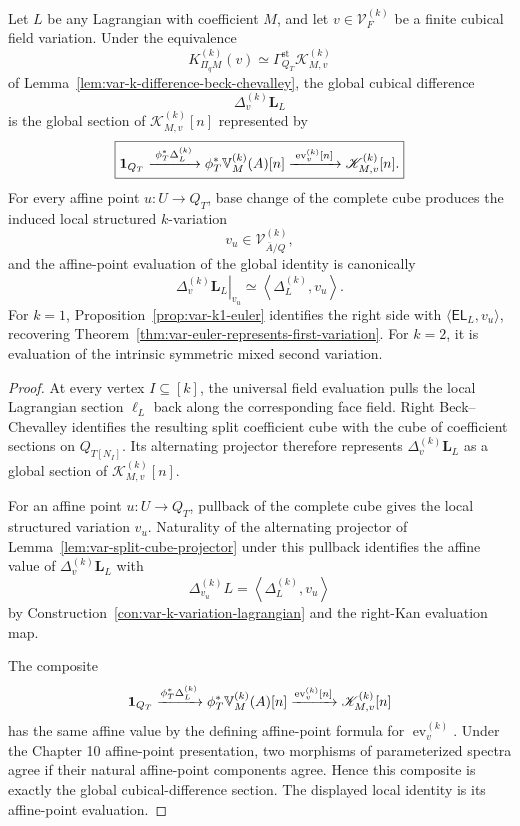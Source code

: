 \begin{theorem}
\label{thm:var-field-k-variation-evaluation}
Let \(L\) be any Lagrangian with coefficient \(M\), and let \(v\in\mathcal V_F^{(k)}\) be a finite cubical field variation. Under the equivalence
\[
    K_{\Pi_qM}^{(k)}(v)
    \simeq
    \Gamma_{Q_T}^{\mathrm{st}}
    \mathscr K^{(k)}_{M,v}
\]
of Lemma~\ref{lem:var-k-difference-beck-chevalley}, the global cubical difference
\[
    \Delta_v^{(k)}\mathbf L_L
\]
is the global section of \(\mathscr K^{(k)}_{M,v}[n]\) represented by
\[
    \boxed{
    \mathbf 1_{Q_T}
    \xrightarrow{\;\phi_T^*\Delta_L^{(k)}\;}
    \phi_T^*\mathbb V_M^{(k)}(A)[n]
    \xrightarrow{\;\operatorname{ev}^{(k)}_v[n]\;}
    \mathscr K^{(k)}_{M,v}[n].
    }
\]
For every affine point \(u:U\to Q_T\), base change of the complete cube produces the induced local structured \(k\)-variation
\[
    v_u\in\mathcal V^{(k)}_{\bar A/Q},
\]
and the affine-point evaluation of the global identity is canonically
\[
    \boxed{
    \left.\Delta_v^{(k)}\mathbf L_L\right|_{v_u}
    \simeq
    \left\langle\Delta_L^{(k)},v_u\right\rangle.
    }
\]
For \(k=1\), Proposition~\ref{prop:var-k1-euler} identifies the right side with \(\langle\mathsf{EL}_L,v_u\rangle\), recovering Theorem~\ref{thm:var-euler-represents-first-variation}. For \(k=2\), it is evaluation of the intrinsic symmetric mixed second variation.
\end{theorem}

\begin{proof}
At every vertex \(I\subseteq[k]\), the universal field evaluation pulls the local Lagrangian section \(\ell_L\) back along the corresponding face field. Right Beck--Chevalley identifies the resulting split coefficient cube with the cube of coefficient sections on \(Q_{T[N_I]}\). Its alternating projector therefore represents \(\Delta_v^{(k)}\mathbf L_L\) as a global section of \(\mathscr K^{(k)}_{M,v}[n]\).

For an affine point \(u:U\to Q_T\), pullback of the complete cube gives the local structured variation \(v_u\). Naturality of the alternating projector of Lemma~\ref{lem:var-split-cube-projector} under this pullback identifies the affine value of \(\Delta_v^{(k)}\mathbf L_L\) with
\[
    \Delta_{v_u}^{(k)}L
    =
    \left\langle\Delta_L^{(k)},v_u\right\rangle
\]
by Construction~\ref{con:var-k-variation-lagrangian} and the right-Kan evaluation map.

The composite
\[
    \mathbf 1_{Q_T}
    \xrightarrow{\phi_T^*\Delta_L^{(k)}}
    \phi_T^*\mathbb V_M^{(k)}(A)[n]
    \xrightarrow{\operatorname{ev}^{(k)}_v[n]}
    \mathscr K^{(k)}_{M,v}[n]
\]
has the same affine value by the defining affine-point formula for \(\operatorname{ev}^{(k)}_v\). Under the Chapter 10 affine-point presentation, two morphisms of parameterized spectra agree if their natural affine-point components agree. Hence this composite is exactly the global cubical-difference section. The displayed local identity is its affine-point evaluation.
\end{proof}

